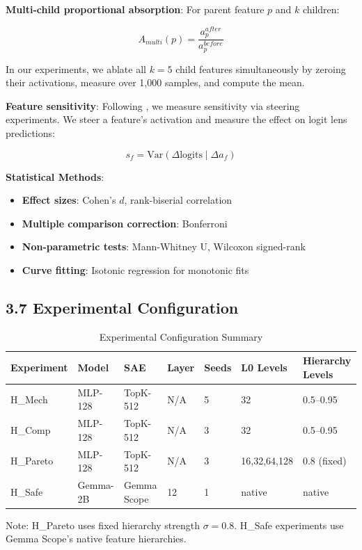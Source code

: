\documentclass{article}
\begin{document}
\textbf{Multi-child proportional absorption}: For parent feature $p$ and $k$ children:

$$A_{multi}(p) = \frac{a_p^{after}}{a_p^{before}}$$

In our experiments, we ablate all $k=5$ child features simultaneously by zeroing their activations, measure over 1,000 samples, and compute the mean.

\textbf{Feature sensitivity}: Following \citet{hu2025measuring}, we measure sensitivity via steering experiments. We steer a feature's activation and measure the effect on logit lens predictions:

$$s_f = \text{Var}(\Delta \text{logits} \mid \Delta a_f)$$

\textbf{Statistical Methods}:
\begin{itemize}
\item \textbf{Effect sizes}: Cohen's $d$, rank-biserial correlation
\item \textbf{Multiple comparison correction}: Bonferroni
\item \textbf{Non-parametric tests}: Mann-Whitney U, Wilcoxon signed-rank
\item \textbf{Curve fitting}: Isotonic regression for monotonic fits
\end{itemize}

\subsection{3.7 Experimental Configuration}

\begin{table}[h]
\centering
\caption{Experimental Configuration Summary}
\label{tab:config}
\begin{tabular}{lllllll}
\toprule
Experiment & Model & SAE & Layer & Seeds & L0 Levels & Hierarchy Levels \\
\midrule
H\_Mech & MLP-128 & TopK-512 & N/A & 5 & 32 & 0.5--0.95 \\
H\_Comp & MLP-128 & TopK-512 & N/A & 3 & 32 & 0.5--0.95 \\
H\_Pareto & MLP-128 & TopK-512 & N/A & 3 & 16,32,64,128 & 0.8 (fixed) \\
H\_Safe & Gemma-2B & Gemma Scope & 12 & 1 & native & native \\
\bottomrule
\end{tabular}
\end{table}

Note: H\_Pareto uses fixed hierarchy strength $\sigma=0.8$. H\_Safe experiments use Gemma Scope's native feature hierarchies.
\end{document}
